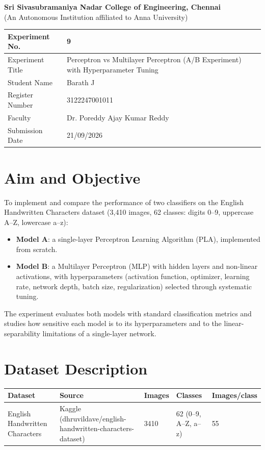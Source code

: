 \documentclass[12pt,a4paper]{article}
\begin{document}
\begin{center}
{\large \textbf{Sri Sivasubramaniya Nadar College of Engineering, Chennai}}\\
{\small (An Autonomous Institution affiliated to Anna University)}
\end{center}
\vspace{0.3cm}

\begin{tabular}{|p{4cm}|p{11cm}|}
\hline
Experiment No. & 9 \\ \hline
Experiment Title & Perceptron vs Multilayer Perceptron (A/B Experiment) with Hyperparameter Tuning \\ \hline
Student Name & Barath J \\ \hline
Register Number & 3122247001011 \\ \hline
Faculty & Dr. Poreddy Ajay Kumar Reddy \\ \hline
Submission Date & 21/09/2026 \\ \hline
\end{tabular}

\section{Aim and Objective}
To implement and compare the performance of two classifiers on the English Handwritten Characters
dataset (3{,}410 images, 62 classes: digits 0--9, uppercase A--Z, lowercase a--z):
\begin{itemize}
\item \textbf{Model A}: a single-layer Perceptron Learning Algorithm (PLA), implemented from scratch.
\item \textbf{Model B}: a Multilayer Perceptron (MLP) with hidden layers and non-linear activations,
with hyperparameters (activation function, optimizer, learning rate, network depth, batch size,
regularization) selected through systematic tuning.
\end{itemize}
The experiment evaluates both models with standard classification metrics and studies how sensitive
each model is to its hyperparameters and to the linear-separability limitations of a single-layer
network.

\section{Dataset Description}
\begin{longtable}{|p{4cm}|p{5cm}|p{1.6cm}|p{1.8cm}|p{2.2cm}|}
\hline
\textbf{Dataset} & \textbf{Source} & \textbf{Images} & \textbf{Classes} & \textbf{Images/class} \\ \hline
English Handwritten Characters & Kaggle (dhruvildave/english-handwritten-characters-dataset) & 3410 & 62 (0--9, A--Z, a--z) & 55 \\ \hline
\end{longtable}
\end{document}
